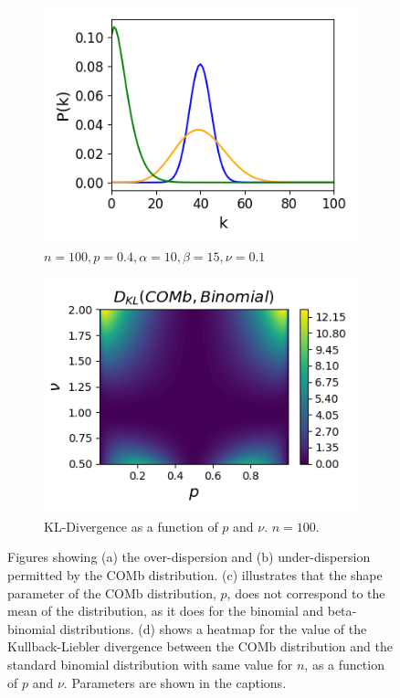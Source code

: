 \documentclass[a4paper,12pt]{article}
\theoremstyle{definition}
\begin{document}
\begin{figure}[h]
\begin{subfigure}[h]{0.5\linewidth}
          \includegraphics[width=\textwidth]{figures/comb_skewed.png}
          \caption{$n=100, p=0.4, \alpha=10, \beta=15, \nu=0.1$}
          \label{fig:comb_skewed}
        \end{subfigure}
        \begin{subfigure}[h]{0.5\linewidth}
          \includegraphics[width=\textwidth]{figures/comb_bin_dkl.png}
          \caption{KL-Divergence as a function of $p$ and $\nu$. $n=100$.}
          \label{fig:comb_bin_dkl}
        \end{subfigure}
        \caption{Figures showing (a) the over-dispersion and (b) under-dispersion permitted by the COMb distribution. (c) illustrates that the shape parameter of the COMb distribution, $p$, does not correspond to the mean of the distribution, as it does for the binomial and beta-binomial distributions. (d) shows a heatmap for the value of the Kullback-Liebler divergence between the COMb distribution and the standard binomial distribution with same value for $n$, as a function of $p$ and $\nu$. Parameters are shown in the captions.}
      \end{figure}
\end{document}
